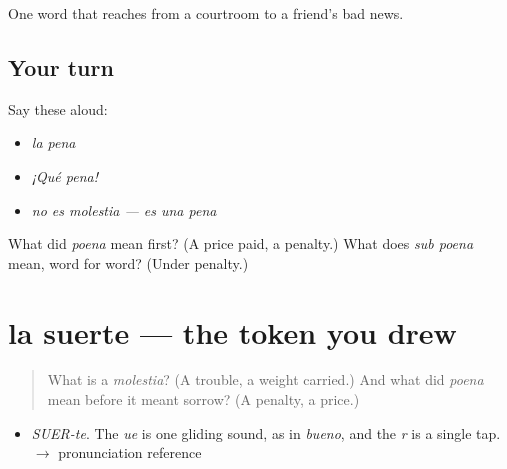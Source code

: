 \begin{grammarlens}[title={What you've built}]
One word that reaches from a courtroom to a friend's bad news.
\end{grammarlens}

\subsection*{Your turn}
Say these aloud:

\begin{itemize}
\raggedright
  \item \emph{la pena}
  \item \emph{¡Qué pena!}
  \item \emph{no es molestia — es una pena}
\end{itemize}

\begin{tcolorbox}[breakable,colback=teal!4,colframe=teal!35!black,title={Before you move on}]
What did \emph{poena} mean first? (A price paid, a penalty.) What does \emph{sub poena} mean, word for word? (Under penalty.)
\end{tcolorbox}
\section[la suerte]{la suerte — the token you drew}

\label{lesson:ES-C320-suerte}



\begin{quote}
What is a \emph{molestia}? (A trouble, a weight carried.) And what did \emph{poena} mean before it meant sorrow? (A penalty, a price.)
\end{quote}

\begin{sounds}
\begin{itemize}
\raggedright
  \item \emph{SUER-te}. The \emph{ue} is one gliding sound, as in \emph{bueno}, and the \emph{r} is a single tap. $\to$ pronunciation reference
\end{itemize}
\end{sounds}


